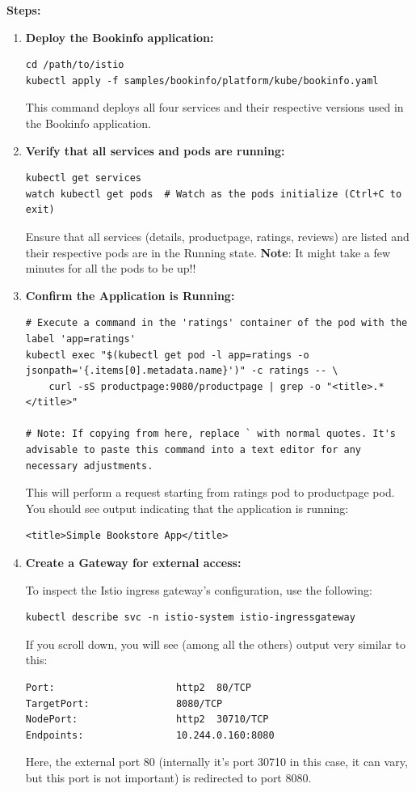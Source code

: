 \documentclass{article}
\begin{document}
\normalsize
\textbf{Steps:}
\begin{enumerate}
    \item \textbf{Deploy the Bookinfo application:}
    \begin{lstlisting}
cd /path/to/istio
kubectl apply -f samples/bookinfo/platform/kube/bookinfo.yaml
    \end{lstlisting}
    This command deploys all four services and their respective versions used in the Bookinfo application.

    \item \textbf{Verify that all services and pods are running:}
    \begin{lstlisting}
kubectl get services
watch kubectl get pods  # Watch as the pods initialize (Ctrl+C to exit)
    \end{lstlisting}
    Ensure that all services (details, productpage, ratings, reviews) are listed and their respective pods are in the Running state. \textbf{Note}: It might take a few minutes for all the pods to be up!!

    \item \textbf{Confirm the Application is Running:}
    \begin{lstlisting}
# Execute a command in the 'ratings' container of the pod with the label 'app=ratings'
kubectl exec "$(kubectl get pod -l app=ratings -o jsonpath='{.items[0].metadata.name}')" -c ratings -- \
    curl -sS productpage:9080/productpage | grep -o "<title>.*</title>"

# Note: If copying from here, replace ` with normal quotes. It's advisable to paste this command into a text editor for any necessary adjustments.
    \end{lstlisting}

    This will perform a request starting from ratings pod to productpage pod. You should see output indicating that the application is running:
    \begin{lstlisting}
<title>Simple Bookstore App</title>
    \end{lstlisting}

    \item \textbf{Create a Gateway for external access:}
    
    To inspect the Istio ingress gateway's configuration, use the following:
    \begin{lstlisting}
kubectl describe svc -n istio-system istio-ingressgateway
    \end{lstlisting}
    If you scroll down, you will see (among all the others) output very similar to this:
    \begin{lstlisting}
Port:                     http2  80/TCP
TargetPort:               8080/TCP
NodePort:                 http2  30710/TCP
Endpoints:                10.244.0.160:8080
  \end{lstlisting}
    Here, the external port 80 (internally it's port 30710 in this case, it can vary, but this port is not important) is redirected to port 8080. 
    

\end{enumerate}
\end{document}
